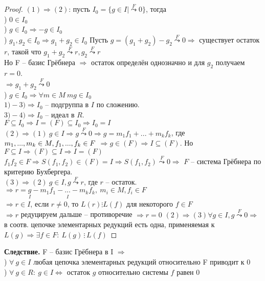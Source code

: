 \begin{proof} 
    $(1) \Rightarrow (2)$: пусть $I_0 = \{g \in I |  \overset{F}{\leadsto}0\}$, тогда \\
    ) $0 \in I_0$ \\
    ) $g \in I_0 \Rightarrow -g \in I_0$ \\
    ) $g_1, g_2 \in I_0 \Rightarrow g_1 + g_2 \in I_0$
    Пусть $g = (g_1 + g_2 ) - g_2\overset{F}{\leadsto}0\Rightarrow$ существует остаток $r$, такой что $g_1+g_2\overset{F}{\leadsto}r, g_2\overset{F}{\leadsto}r$\\
    Но F -- базис Грёбнера $\Rightarrow $ остаток определён однозначно и для $g_2$ получаем $r=0$.\\
    $\Rightarrow g_1+g_2\overset{F}{\leadsto}0$\\
    ) $g\in I_0\Rightarrow \forall m\in M\ mg\in I_0$\\
    \indent$1)-3)\Rightarrow I_0$ -- подгруппа в $I $ по сложению. \\
    \indent$3)-4)\Rightarrow I_0$ -- идеал в $R$.\\
    $F\subseteq I_0\Rightarrow I=(F)\subseteq I_0\Rightarrow I_0=I$\\
    \indent$(2)\Rightarrow (1) \ g\in I\Rightarrow g\overset{F}{\leadsto}0\Rightarrow g=m_1f_1+...+m_kf_k$, где $m_1,...,m_k\in M, f_1,...,f_k\in F\\$
    $\Rightarrow g\in (F)\Rightarrow I\subseteq (F)$. Но $F\subseteq I\Rightarrow (F)\subseteq I\Rightarrow I=(F)$\\
    $f_1f_2\in F\Rightarrow S(f_1,f_2)\in (F)=I\Rightarrow S(f_1,f_2)\overset{F}{\leadsto}0\Rightarrow$ $F$ -- система Грёбнера по критерию Бухбергера.\\
    \indent $(3)\Rightarrow (2) \ g\in I, g\overset{F}{\leadsto}r$, где $r$ -- остаток. $\Rightarrow r=\underset{I}{g}-\underset{I}{m_1f_1-...-m_kf_k}, \ m_i\in M, f_i\in F$\\
    $\Rightarrow r\in I$, если $r\neq 0$, то $L(r)\vdots L(f)$ для некоторого $f\in F$\\
    $\Rightarrow r$ редуцируем дальше -- противоречие $\Rightarrow r=0$
    \indent $(2)\Rightarrow (3) \forall g \in I, g\overset{F}{\leadsto}0 \Rightarrow$ в соотв. цепочке элементарных редукций есть одна, применяемая к $L(g) \Rightarrow \exists f \in F:\ L(g)\, \vdots\, L(f)$
\end{proof}
\noindent \textbf{Следствие.} F -- базис Грёбнера в I $\Rightarrow $\\
) $\forall \ g\in I $ любая цепочка элементарных редукций относительно F приводит к 0\\
) $\forall \ g\in R:\ g\in I \Leftrightarrow $ остаток $g$ относительно системы $f$ равен 0

